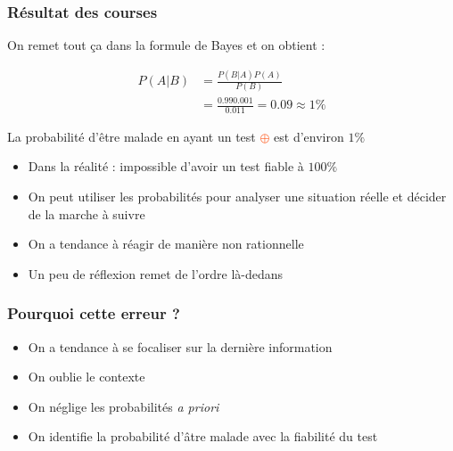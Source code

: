 \documentclass[usenames, dvipsnames]{beamer}
\newcommand{\positif}{\textcolor{OrangeRed}{$\oplus$} }
\begin{document}
\begin{frame}[plain]
\frametitle{Résultat des courses}

On remet tout ça dans la formule de Bayes et on obtient :

\begin{align*}
P(A|B) &= \frac{P(B|A)P(A)}{P(B)}\\
&= \frac{0.99 0.001}{0.011} = 0.09 \approx 1\%
\end{align*}


\pause
La probabilité d'être malade en ayant un test \positif est d'environ $1\%$

\pause

\begin{itemize}
\item Dans la réalité : impossible d'avoir un test fiable à $100\%$ \pause
\item On peut utiliser les probabilités pour analyser une situation réelle et décider de la marche à suivre \pause
\item On a tendance à réagir de manière non rationnelle\pause
\item Un peu de réflexion remet de l'ordre là-dedans%
\end{itemize}


\end{frame}


\begin{frame}[plain]
\frametitle{Pourquoi cette erreur ?}






\vspace{2cm}

\begin{itemize}
\item<2-> On a tendance à se focaliser sur la dernière information
\item<3-> On oublie le contexte
\item<4-> On néglige les probabilités \textit{a priori}
\item<5-> On identifie la probabilité d'âtre malade avec la fiabilité du test
\end{itemize}


\end{frame}
\end{document}
